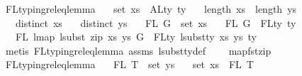 \begin{isabellebody}
%
\endisadelimproof
\isanewline
\isanewline
{}\isamarkupfalse%
\ FL{\isacharunderscore}{\kern0pt}typing{\isacharunderscore}{\kern0pt}rel{\isacharunderscore}{\kern0pt}eq{\isacharunderscore}{\kern0pt}lemma{}{\isacharcolon}{\kern0pt}\isanewline
\ \ \ {\isachardoublequoteopen}set\ xs\ {\isacharequal}{\kern0pt}\ ALty\ ty{\isachardoublequoteclose}\isanewline
\ \ \ {\isachardoublequoteopen}length\ xs\ {\isacharequal}{\kern0pt}\ length\ ys{\isachardoublequoteclose}\isanewline
\ \ \ {\isachardoublequoteopen}distinct\ xs{\isachardoublequoteclose}\isanewline
\ \ \ {\isachardoublequoteopen}distinct\ ys{\isachardoublequoteclose}\isanewline
\ \ \ {\isachardoublequoteopen}FL\ G\ {\isasymsubseteq}\ set\ xs{\isachardoublequoteclose}\isanewline
\ \ \ {\isachardoublequoteopen}FL\ G\ {\isacharequal}{\kern0pt}\ FLty\ ty{\isachardoublequoteclose}\isanewline
\ \ \ {\isachardoublequoteopen}FL\ {\isacharparenleft}{\kern0pt}lmap\ {\isacharparenleft}{\kern0pt}lsubst\ {\isacharparenleft}{\kern0pt}zip\ xs\ ys{\isacharparenright}{\kern0pt}{\isacharparenright}{\kern0pt}\ G{\isacharparenright}{\kern0pt}\ {\isacharequal}{\kern0pt}\ FLty\ {\isacharparenleft}{\kern0pt}lsubst{\isacharunderscore}{\kern0pt}ty\ xs\ ys\ ty{\isacharparenright}{\kern0pt}{\isachardoublequoteclose}\isanewline
%
\isadelimproof
%
\endisadelimproof
%
\isatagproof
{}\isamarkupfalse%
\ {\isacharparenleft}{\kern0pt}metis\ FL{\isacharunderscore}{\kern0pt}typing{\isacharunderscore}{\kern0pt}rel{\isacharunderscore}{\kern0pt}eq{\isacharunderscore}{\kern0pt}lemma{}\ assms{\isacharparenleft}{\kern0pt}{}{\isacharcomma}{\kern0pt}{}{\isacharcomma}{\kern0pt}{}{\isacharcomma}{\kern0pt}{}{\isacharparenright}{\kern0pt}\ lsubst{\isacharunderscore}{\kern0pt}ty{\isacharunderscore}{\kern0pt}def\isanewline
\ \ \ \ map{\isacharunderscore}{\kern0pt}fst{\isacharunderscore}{\kern0pt}zip{\isacharparenright}{\kern0pt}%
\endisatagproof
{\isafoldproof}%
%
\isadelimproof
\isanewline
%
\endisadelimproof
\isanewline
\isanewline
{}\isamarkupfalse%
\ FL{\isacharunderscore}{\kern0pt}typing{\isacharunderscore}{\kern0pt}rel{\isacharunderscore}{\kern0pt}eq{\isacharunderscore}{\kern0pt}lemma{}{\isacharcolon}{\kern0pt}\isanewline
\ \ \ {\isachardoublequoteopen}FL\ T\ {\isacharequal}{\kern0pt}\ set\ ys{\isachardoublequoteclose}\isanewline
\ \ \ {\isachardoublequoteopen}set\ xs\ {\isasymsubseteq}\ FL\ T{\isachardoublequoteclose}\isanewline

\end{isabellebody}
